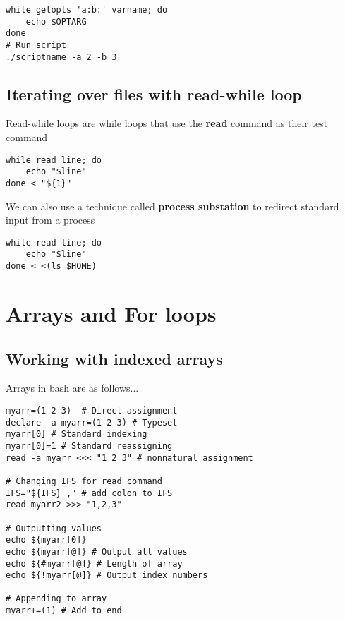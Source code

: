 \documentclass{report}
\begin{document}
    \begin{verbatim}
while getopts 'a:b:' varname; do 
    echo $OPTARG
done
# Run script
./scriptname -a 2 -b 3
    \end{verbatim}
    \bigbreak \noindent
    

    \pagebreak \bigbreak \noindent 
    \subsection{Iterating over files with read-while loop}
    \bigbreak \noindent 
    \begin{concept}
        Read-while loops are while loops that use the \textbf{read} command as their test command
    \end{concept}
    
    \begin{verbatim}
while read line; do
    echo "$line"
done < "${1}"
    \end{verbatim}
    \bigbreak \noindent
    
    \bigbreak \noindent 
    We can also use a technique called \textbf{process substation} to redirect standard input from a process
    
    \begin{verbatim}
while read line; do
    echo "$line"
done < <(ls $HOME)
    \end{verbatim}
    \bigbreak \noindent
    

    \pagebreak \bigbreak \noindent 
    \section{\LARGE Arrays and For loops}
    \bigbreak \noindent 
    \subsection{Working with indexed arrays}
    Arrays in bash are as follows...
    
    \begin{verbatim}
myarr=(1 2 3)  # Direct assignment
declare -a myarr=(1 2 3) # Typeset
myarr[0] # Standard indexing
myarr[0]=1 # Standard reassigning
read -a myarr <<< "1 2 3" # nonnatural assignment

# Changing IFS for read command
IFS="${IFS} ," # add colon to IFS
read myarr2 >>> "1,2,3"

# Outputting values
echo ${myarr[0]}
echo ${myarr[@]} # Output all values
echo ${#myarr[@]} # Length of array
echo ${!myarr[@]} # Output index numbers

# Appending to array
myarr+=(1) # Add to end
    \end{verbatim}
    \bigbreak \noindent
    
\end{document}
